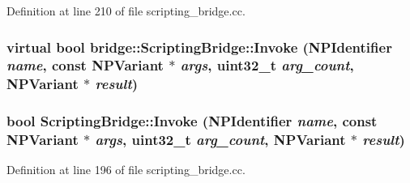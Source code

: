 Definition at line 210 of file scripting\_\-bridge.cc.

\hypertarget{classbridge_1_1_scripting_bridge_a84f78dde38b524b61e72afebf7210483}{
\subsubsection[{Invoke}]{\setlength{\rightskip}{0pt plus 5cm}virtual bool bridge::ScriptingBridge::Invoke (NPIdentifier {\em name}, \/  const NPVariant $\ast$ {\em args}, \/  uint32\_\-t {\em arg\_\-count}, \/  NPVariant $\ast$ {\em result})}}
\label{classbridge_1_1_scripting_bridge_a84f78dde38b524b61e72afebf7210483}
\hypertarget{classbridge_1_1_scripting_bridge_ad18d2af321b2cba1235876cf281295df}{
\subsubsection[{Invoke}]{\setlength{\rightskip}{0pt plus 5cm}bool ScriptingBridge::Invoke (NPIdentifier {\em name}, \/  const NPVariant $\ast$ {\em args}, \/  uint32\_\-t {\em arg\_\-count}, \/  NPVariant $\ast$ {\em result})}}
\label{classbridge_1_1_scripting_bridge_ad18d2af321b2cba1235876cf281295df}


Definition at line 196 of file scripting\_\-bridge.cc.


